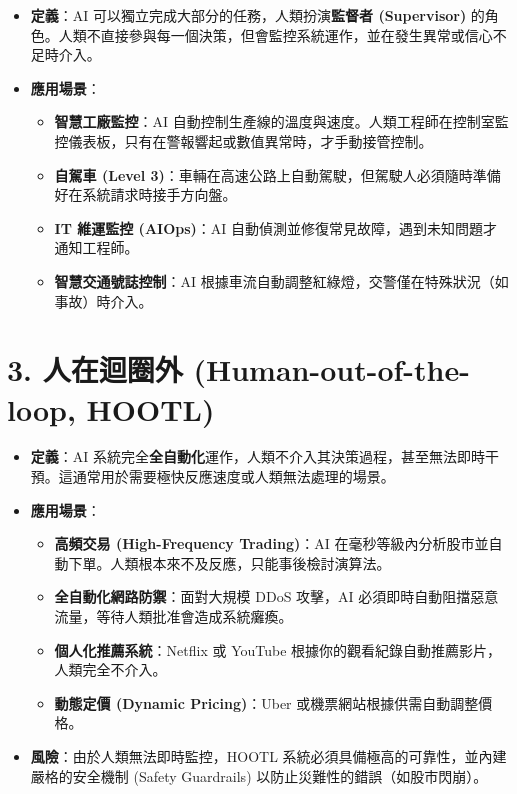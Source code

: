 \documentclass[
  letterpaper,
  DIV=11,
  numbers=noendperiod]{scrreprt}
\providecommand{\tightlist}{%
  \setlength{\itemsep}{0pt}\setlength{\parskip}{0pt}}
\begin{document}
\begin{itemize}
\tightlist
\item
  \textbf{定義}：AI 可以獨立完成大部分的任務，人類扮演\textbf{監督者
  (Supervisor)}
  的角色。人類不直接參與每一個決策，但會監控系統運作，並在發生異常或信心不足時介入。
\item
  \textbf{應用場景}：

  \begin{itemize}
  \tightlist
  \item
    \textbf{智慧工廠監控}：AI
    自動控制生產線的溫度與速度。人類工程師在控制室監控儀表板，只有在警報響起或數值異常時，才手動接管控制。
  \item
    \textbf{自駕車 (Level
    3)}：車輛在高速公路上自動駕駛，但駕駛人必須隨時準備好在系統請求時接手方向盤。
  \item
    \textbf{IT 維運監控 (AIOps)}：AI
    自動偵測並修復常見故障，遇到未知問題才通知工程師。
  \item
    \textbf{智慧交通號誌控制}：AI
    根據車流自動調整紅綠燈，交警僅在特殊狀況（如事故）時介入。
  \end{itemize}
\end{itemize}

\section{3. 人在迴圈外 (Human-out-of-the-loop, HOOTL)}\label{sec-hootl}

\begin{itemize}
\tightlist
\item
  \textbf{定義}：AI
  系統完全\textbf{全自動化}運作，人類不介入其決策過程，甚至無法即時干預。這通常用於需要極快反應速度或人類無法處理的場景。
\item
  \textbf{應用場景}：

  \begin{itemize}
  \tightlist
  \item
    \textbf{高頻交易 (High-Frequency Trading)}：AI
    在毫秒等級內分析股市並自動下單。人類根本來不及反應，只能事後檢討演算法。
  \item
    \textbf{全自動化網路防禦}：面對大規模 DDoS 攻擊，AI
    必須即時自動阻擋惡意流量，等待人類批准會造成系統癱瘓。
  \item
    \textbf{個人化推薦系統}：Netflix 或 YouTube
    根據你的觀看紀錄自動推薦影片，人類完全不介入。
  \item
    \textbf{動態定價 (Dynamic Pricing)}：Uber
    或機票網站根據供需自動調整價格。
  \end{itemize}
\item
  \textbf{風險}：由於人類無法即時監控，HOOTL
  系統必須具備極高的可靠性，並內建嚴格的安全機制 (Safety Guardrails)
  以防止災難性的錯誤（如股市閃崩）。
\end{itemize}
\end{document}
